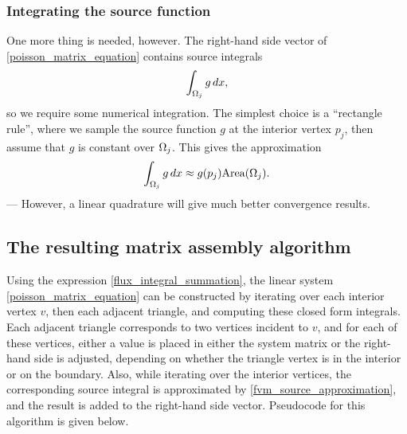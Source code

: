 \subsubsection{Integrating the source function}
One more thing is needed, however. The right-hand side vector of \eqref{poisson_matrix_equation} contains source integrals
    $$\int_{{\Omega}_j}g\,dx,$$
so we require some numerical integration.
The simplest choice is a ``rectangle rule'', where we sample the source function $g$ at the interior vertex
$p_j$, then assume that $g$ is constant over ${\Omega}_j$. This gives the approximation
\begin{equation}\label{fvm_source_approximation}
    \int_{{\Omega}_j}g\,dx \approx g(p_j)\text{Area}({\Omega}_j).
\end{equation}
--- However, a linear quadrature will give much better convergence results.

\subsection{The resulting matrix assembly algorithm}
Using the expression \eqref{flux_integral_summation}, the linear system
\eqref{poisson_matrix_equation} can be constructed by iterating over each interior vertex $v$, then each adjacent triangle,
and computing these closed form integrals.
Each adjacent triangle corresponds to two vertices incident to $v$, and for each of these vertices,
either a value is placed in either the system matrix or the right-hand side is adjusted,
depending on whether the triangle vertex is in the interior or on the boundary. Also, while iterating over the interior vertices,
the corresponding source integral is approximated by \eqref{fvm_source_approximation}, and the result is added to the right-hand side vector.
Pseudocode for this algorithm is given below.


\newcommand{\poissonfvmmatrixassembly}{Poisson\_FVM\_Matrix\_Assembly}


